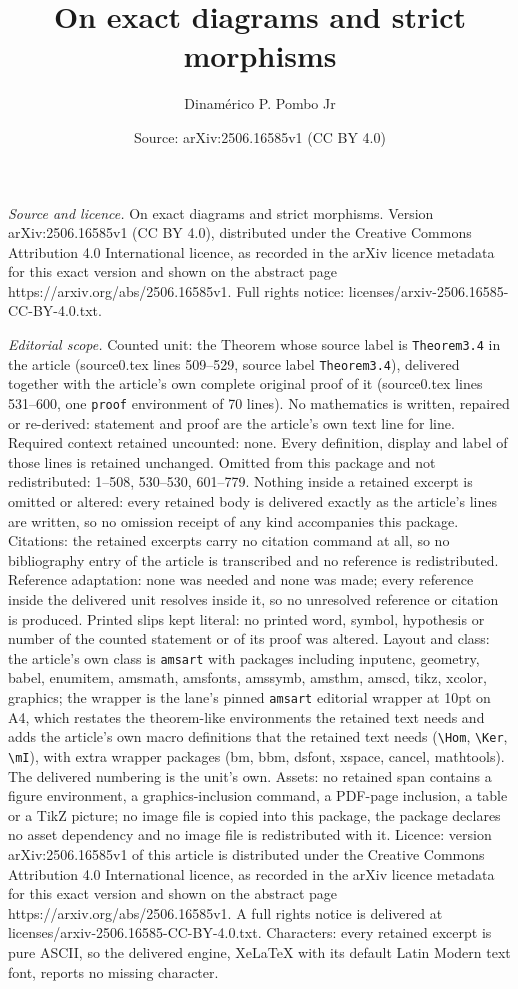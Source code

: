 \documentclass[10pt,a4paper]{amsart}
\title[On exact diagrams and strict morphisms]{On exact diagrams and strict morphisms}
\author{Dinam\'erico P. Pombo Jr}
\date{Source: arXiv:2506.16585v1 (CC BY 4.0)}
\begin{document}
\maketitle

\noindent\emph{Source and licence.} On exact diagrams and strict morphisms. Version arXiv:2506.16585v1 (CC BY 4.0), distributed under the Creative Commons Attribution 4.0 International licence, as recorded in the arXiv licence metadata for this exact version and shown on the abstract page https://arxiv.org/abs/2506.16585v1. Full rights notice: licenses/arxiv-2506.16585-CC-BY-4.0.txt.\par\smallskip

\noindent\textit{Editorial scope.} Counted unit: the Theorem whose source label is \texttt{Theorem3.4} in the article (source0.tex lines 509--529, source label \texttt{Theorem3.4}), delivered together with the article's own complete original proof of it (source0.tex lines 531--600, one \texttt{proof} environment of 70 lines). No mathematics is written, repaired or re-derived: statement and proof are the article's own text line for line. Required context retained uncounted: none. Every definition, display and label of those lines is retained unchanged. Omitted from this package and not redistributed: 1--508, 530--530, 601--779. Nothing inside a retained excerpt is omitted or altered: every retained body is delivered exactly as the article's lines are written, so no omission receipt of any kind accompanies this package. Citations: the retained excerpts carry no citation command at all, so no bibliography entry of the article is transcribed and no reference is redistributed. Reference adaptation: none was needed and none was made; every reference inside the delivered unit resolves inside it, so no unresolved reference or citation is produced. Printed slips kept literal: no printed word, symbol, hypothesis or number of the counted statement or of its proof was altered. Layout and class: the article's own class is \texttt{amsart} with packages including inputenc, geometry, babel, enumitem, amsmath, amsfonts, amssymb, amsthm, amscd, tikz, xcolor, graphics; the wrapper is the lane's pinned \texttt{amsart} editorial wrapper at 10pt on A4, which restates the theorem-like environments the retained text needs and adds the article's own macro definitions that the retained text needs (\texttt{\textbackslash Hom}, \texttt{\textbackslash Ker}, \texttt{\textbackslash mI}), with extra wrapper packages (bm, bbm, dsfont, xspace, cancel, mathtools). The delivered numbering is the unit's own. Assets: no retained span contains a figure environment, a graphics-inclusion command, a PDF-page inclusion, a table or a TikZ picture; no image file is copied into this package, the package declares no asset dependency and no image file is redistributed with it. Licence: version arXiv:2506.16585v1 of this article is distributed under the Creative Commons Attribution 4.0 International licence, as recorded in the arXiv licence metadata for this exact version and shown on the abstract page https://arxiv.org/abs/2506.16585v1. A full rights notice is delivered at licenses/arxiv-2506.16585-CC-BY-4.0.txt. Characters: every retained excerpt is pure ASCII, so the delivered engine, XeLaTeX with its default Latin Modern text font, reports no missing character.
\end{document}
